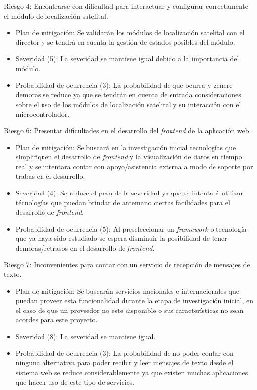 \documentclass[
11pt, %
]{charter}
\begin{document}
Riesgo 4: Encontrarse con dificultad para interactuar y configurar correctamente el módulo de localización satelital.
\begin{itemize}
	\item Plan de mitigación: Se validarán los módulos de localización satelital con el director y se tendrá en cuenta la gestión de estados posibles del módulo.
	\item Severidad (5):  La severidad se mantiene igual debido a la importancia del módulo.
	\item Probabilidad de ocurrencia (3): La probabilidad de que ocurra y genere demoras se reduce ya que se tendrán en cuenta de entrada consideraciones sobre el uso de los módulos de localización satelital y su interacción con el microcontrolador.
\end{itemize}

Riesgo 6: Presentar dificultades en el desarrollo del \textit{frontend} de la aplicación web.
\begin{itemize}
	\item Plan de mitigación: Se buscará en la investigación inicial tecnologías que simplifiquen el desarrollo de \textit{frontend} y la visualización de datos en tiempo real y se intentara contar con apoyo/asistencia externa a modo de soporte por trabas en el desarrollo.
	\item Severidad (4): Se reduce el peso de la severidad ya que se intentará utilizar técnologías que puedan brindar de antemano ciertas facilidades para el desarrollo de \textit{frontend}.
	\item Probabilidad de ocurrencia (5): Al preseleccionar un \textit{framework} o tecnología que ya haya sido estudiado se espera disminuir la posibilidad de tener demoras/retrasos en el desarrollo de \textit{frontend}.
\end{itemize}

Riesgo 7: Inconvenientes para contar con un servicio de recepción de mensajes de texto.
\begin{itemize}
	\item Plan de mitigación: Se buscarán servicios nacionales e internacionales que puedan proveer esta funcionalidad durante la etapa de investigación inicial, en el caso de que un proveedor no este disponible o sus características no sean acordes para este proyecto. 
	\item Severidad (8): La severidad se mantiene igual.
	\item Probabilidad de ocurrencia (3): La probabilidad de no poder contar con ninguna alternativa para poder recibir y leer mensajes de texto desde el sistema web se reduce considerablemente ya que existen muchas aplicaciones que hacen uso de este tipo de servicios.
\end{itemize}
\end{document}
